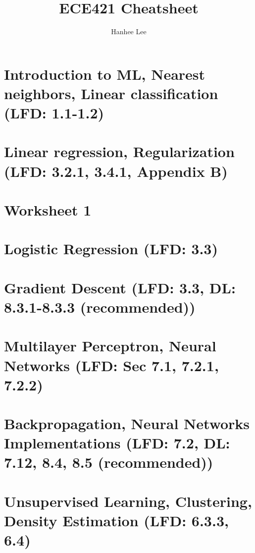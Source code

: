 \documentclass{article}
\title{ECE421 Cheatsheet}
\author{Hanhee Lee}
\begin{document}
\maketitle

\tableofcontents

\listoffigures

\listoftables

\section{Introduction to ML, Nearest neighbors, Linear classification (LFD: 1.1-1.2)}


\section{Linear regression, Regularization (LFD: 3.2.1, 3.4.1, Appendix B)}


\section{Worksheet 1}


\section{Logistic Regression (LFD: 3.3)}


\section{Gradient Descent (LFD: 3.3, DL: 8.3.1-8.3.3 (recommended))}


\section{Multilayer Perceptron, Neural Networks (LFD: Sec 7.1, 7.2.1, 7.2.2)}


\section{Backpropagation, Neural Networks Implementations (LFD: 7.2, DL: 7.12, 8.4, 8.5 (recommended))}


\section{Unsupervised Learning, Clustering, Density Estimation (LFD: 6.3.3, 6.4)}

\end{document}
